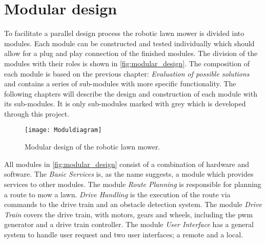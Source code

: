 \graphicspath{{figures/design/}}
\chapter{Modular design}\label{ch:moddesign}

To facilitate a parallel design process the robotic lawn mower is divided into modules. Each module can be constructed and tested individually which should allow for a plug and play connection of the finished modules. The division of the modules with their roles is shown in \autoref{fig:modular_design}. The composition of each module is based on the previous chapter: \textit{Evaluation of possible solutions} and contains a series of sub-modules with more specific functionality. The following chapters will describe the design and construction of each module with its sub-modules. It is only sub-modules marked with grey which is developed through this project.

\begin{figure}[htb]
\texttt{[image: Moduldiagram]}
\caption{Modular design of the robotic lawn mower.}
\label{fig:modular_design}
\end{figure}

All modules in \autoref{fig:modular_design} consist of a combination of hardware and software. The \textit{Basic Services} is, as the name suggests, a module which provides services to other modules. The module \textit{Route Planning} is responsible for planning a route to mow a lawn. \textit{Drive Handling} is the execution of the route via commands to the drive train and an obstacle detection system. The module \textit{Drive Train} covers the drive train, with motors, gears and wheels, including the \gls{pwm} generator and a drive train controller. The module \textit{User Interface} has a general system to handle user request and two user interfaces; a remote and a local. 
